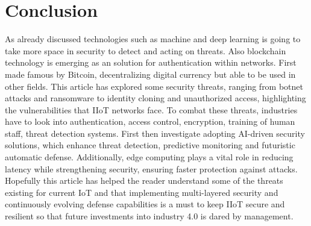 \documentclass[article,a4paper]{IEEEtran}
\begin{document}
\section{       Conclusion}
As already discussed technologies such as machine and deep learning is going to take more space in security to detect and acting on threats. Also blockchain technology is emerging as an solution for authentication within networks. First made famous by Bitcoin, decentralizing digital currency but able to be used in other fields. This article has explored some security threats, ranging from botnet attacks and ransomware to identity cloning and unauthorized access, highlighting the vulnerabilities that IIoT networks face. 
\newline\newline
To combat these threats, industries have to look into authentication, access control, encryption, training of human staff, threat detection systems. First then investigate adopting AI-driven security solutions, which enhance threat detection, predictive monitoring and futuristic automatic defense. Additionally, edge computing plays a vital role in reducing latency while strengthening security, ensuring faster protection against attacks. 
\newline\newline
Hopefully this article has helped the reader understand some of the threats existing for current IoT and that implementing multi-layered security and continuously evolving defense capabilities is a must to keep IIoT secure and resilient so that future investments into industry 4.0 is dared by management.  
\printbibliography
\end{document}
